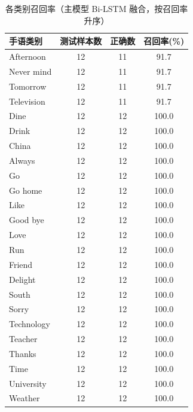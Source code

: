 \begin{table}[htbp]\centering
\caption{各类别召回率（主模型 Bi-LSTM 融合，按召回率升序）}
\label{tab:perclass}
\begin{tabular}{lccc}
\toprule
手语类别 & 测试样本数 & 正确数 & 召回率(\%) \\
\midrule
Afternoon & 12 & 11 & 91.7 \\
Never mind & 12 & 11 & 91.7 \\
Tomorrow & 12 & 11 & 91.7 \\
Television & 12 & 11 & 91.7 \\
Dine & 12 & 12 & 100.0 \\
Drink & 12 & 12 & 100.0 \\
China & 12 & 12 & 100.0 \\
Always & 12 & 12 & 100.0 \\
Go & 12 & 12 & 100.0 \\
Go home & 12 & 12 & 100.0 \\
Like & 12 & 12 & 100.0 \\
Good bye & 12 & 12 & 100.0 \\
Love & 12 & 12 & 100.0 \\
Run & 12 & 12 & 100.0 \\
Friend & 12 & 12 & 100.0 \\
Delight & 12 & 12 & 100.0 \\
South & 12 & 12 & 100.0 \\
Sorry & 12 & 12 & 100.0 \\
Technology & 12 & 12 & 100.0 \\
Teacher & 12 & 12 & 100.0 \\
Thanks & 12 & 12 & 100.0 \\
Time & 12 & 12 & 100.0 \\
University & 12 & 12 & 100.0 \\
Weather & 12 & 12 & 100.0 \\
\bottomrule
\end{tabular}
\end{table}
